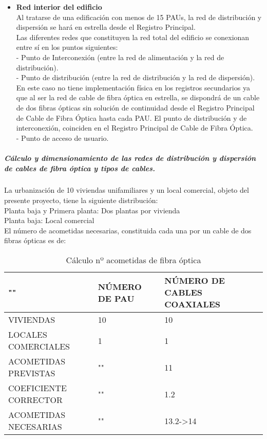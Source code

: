 \begin{itemize}
	\item \textbf{Red interior del edificio}\\
Al tratarse de una edificación con menos de 15 PAUs, la red de distribución y dispersión se hará
en estrella desde el Registro Principal.\\
Las diferentes redes que constituyen la red total del edificio se conexionan entre sí en los puntos
siguientes:\\
- Punto de Interconexión (entre la red de alimentación y la red de distribución).\\
- Punto de distribución (entre la red de distribución y la red de dispersión). En este caso no tiene
implementación física en los registros secundarios ya que al ser la red de cable de fibra óptica en
estrella, se dispondrá de un cable de dos fibras ópticas sin solución de continuidad desde el
Registro Principal de Cable de Fibra Óptica hasta cada PAU. El punto de distribución y de
interconexión, coinciden en el Registro Principal de Cable de Fibra Óptica.\\
- Punto de acceso de usuario.\\
\end{itemize}
\subparagraph{Cálculo y dimensionamiento de las redes de distribución y dispersión de cables de fibra óptica y tipos de cables.}
La urbanización de 10 viviendas unifamiliares y un local comercial, objeto del presente proyecto, tiene la siguiente distribución:\\
Planta baja y Primera planta:			Dos plantas por vivienda\\
Planta baja:							Local comercial\\
El número de acometidas necesarias, constituida cada una por un cable de dos fibras ópticas es de:
\begin{table}[H]
\centering
\begin{tabular}{p{5cm} p{5cm} p{5cm}}
\hline
""&NÚMERO DE PAU&NÚMERO DE CABLES COAXIALES \\
\hline \hline
VIVIENDAS&10&10\\
\hline
LOCALES COMERCIALES&1&1\\
\hline
ACOMETIDAS PREVISTAS&""&11\\
\hline
COEFICIENTE CORRECTOR&""&1.2\\
\hline
ACOMETIDAS NECESARIAS&""&13.2->14\\
\end{tabular}
\caption{Cálculo nº acometidas de fibra óptica}
\label{tabla:autores}
\end{table}
